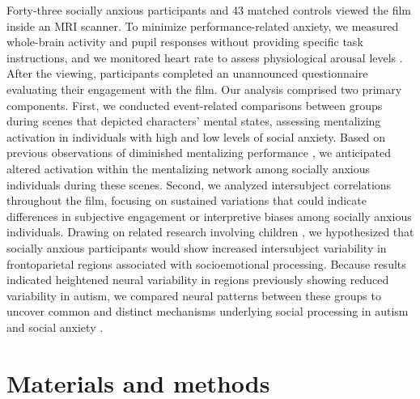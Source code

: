 Forty-three socially anxious participants and 43 matched controls viewed the film inside an MRI scanner. To minimize performance-related anxiety, we measured whole-brain activity and pupil responses without providing specific task instructions, and we monitored heart rate to assess physiological arousal levels \citep{wascher2021}. After the viewing, participants completed an unannounced questionnaire evaluating their engagement with the film. Our analysis comprised two primary components. First, we conducted event-related comparisons between groups during scenes that depicted characters' mental states, assessing mentalizing activation in individuals with high and low levels of social anxiety. Based on previous observations of diminished mentalizing performance \citep{baez2023}, we anticipated altered activation within the mentalizing network among socially anxious individuals during these scenes. Second, we analyzed intersubject correlations throughout the film, focusing on sustained variations that could indicate differences in subjective engagement or interpretive biases among socially anxious individuals. Drawing on related research involving children \citep{camacho2023}, we hypothesized that socially anxious participants would show increased intersubject variability in frontoparietal regions associated with socioemotional processing. Because results indicated heightened neural variability in regions previously showing reduced variability in autism, we compared neural patterns between these groups to uncover common and distinct mechanisms underlying social processing in autism and social anxiety \citep{white2009}.


\section{Materials and methods}
